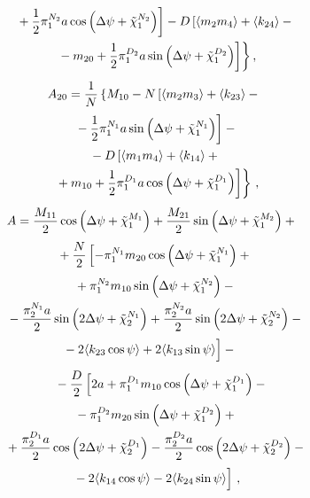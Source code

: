 \begin{multicols}{2}
\begin{multline}
\left.{}+\displaystyle\frac{\displaystyle 1\mathstrut}{\displaystyle 2\mathstrut} \pi_1^{N_2}a \cos \left(\Delta \psi +\tilde \chi_1^{N_2}\right)\right]
- D\left[ \langle m_2 m_4\rangle +\langle k_{24}\rangle - {}\right.\\
\left.\left.{}-m_{20}+ \displaystyle\frac{\displaystyle 1\mathstrut}{\displaystyle 2\mathstrut} \pi_1^{D_2}a \sin \left(\Delta \psi
 +\tilde \chi_1^{D_2}\right)\right]\right\},\label{e27s}
 \end{multline}
 \begin{multline}
A_{20} = \displaystyle\frac{\displaystyle 1\mathstrut}{\displaystyle N\mathstrut} \left\{
 M_{10} - N \left[ \langle m_2 m_3\rangle +\langle k_{23}\rangle - {}\right.\right.\\
\left.{}-\displaystyle\frac{\displaystyle 1\mathstrut}{\displaystyle 2\mathstrut} \pi_1^{N_1}a \sin \left(\Delta \psi
 +\tilde \chi_1^{N_1}\right)\right]-{}\\
{}- D\left[ \langle m_1 m_4\rangle +\langle k_{14}\rangle + {}\right.\\
\left.\left.{}+ m_{10}+ \displaystyle\frac{\displaystyle 1\mathstrut}{\displaystyle 2\mathstrut} \pi_1^{D_1}a \cos \left(\Delta \psi
 +\tilde \chi_1^{D_1}\right)\right]\right\}\,,\label{e28s}
 \end{multline}
\begin{multline}
\!\!\!A= \fr{M_{11}}{ 2} \cos \left(\Delta \psi+\tilde \chi_1^{M_1}\right)+
\fr{M_{21}}{2} \sin \left(\Delta \psi+\tilde \chi_1^{M_2}\right)+{}\\
{}+\fr{N}{ 2} \left[ -\pi_1^{N_1} m_{20} \cos \left(\Delta \psi+\tilde \chi_1^{N_1}\right)+{}\right.\\
{}+ \pi_1^{N_2} m_{10} \sin \left(\Delta \psi+\tilde \chi_1^{N_2}\right)-{}\\
{}-\fr{\pi_2^{N_1} a}{2} \sin \left(2\Delta \psi+\tilde \chi_2^{N_1}\right)+
\fr{\pi_2^{N_2} a}{2} \sin \left(2\Delta \psi+\tilde \chi_2^{N_2}\right)-{}\\
\left. \vphantom{\pi_2^{N_1}}-2 \langle k_{23}\cos\psi\rangle + 2 \langle k_{13}\sin\psi\rangle\right]-{}\quad\notag
 \end{multline}
\begin{multline}
\quad{}- \fr{D}{2} \left[ 2a +
 \pi_1^{D_1} m_{10} \cos \left(\Delta \psi +\tilde\chi_1^{D_1}\right) -{}\right.\\
{}- \pi_1^{D_2} m_{20} \sin \left(\Delta \psi +\tilde\chi_1^{D_2}\right)+{}\\
{}+ \fr{\pi_2^{D_1} a}{2} \cos \left(2\Delta \psi +\tilde\chi_2^{D_1}\right) -
\fr{\pi_2^{D_2}a}{2} \cos \left(2\Delta \psi+\tilde\chi_2^{D_2}\right) -{}\\
\left. \vphantom{\pi_2^{N_1}}{}-2 \langle k_{14}\cos\psi\rangle-
 2\langle k_{24}\sin\psi\rangle\right]\,,\label{e29s}
 \end{multline}
\begin{multline}

\end{multline}
\end{multicols}

